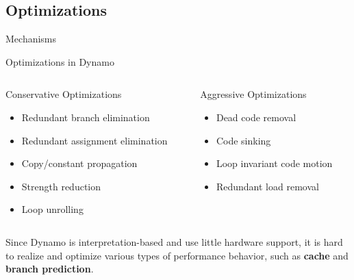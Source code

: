 \documentclass[aspectratio=169,xcolor=x11names]{beamer}
\begin{document}
	\subsection{Optimizations}
	\begin{frame}{Mechanisms}
	\end{frame}

	\begin{frame}{Optimizations in Dynamo}
		\begin{columns}
			\begin{column}[T]{0.5\linewidth}
				\begin{block}{Conservative Optimizations}
					\begin{itemize}
						\item Redundant branch elimination
						\item Redundant assignment elimination
						\item Copy/constant propagation
						\item Strength reduction
						\item Loop unrolling
					\end{itemize}
				\end{block}
			\end{column}
			\begin{column}[T]{0.5\linewidth}
				\begin{block}{Aggressive Optimizations}
					\begin{itemize}
						\item Dead code removal
						\item Code sinking
						\item Loop invariant code motion
						\item Redundant load removal %
					\end{itemize}
				\end{block}
			\end{column}
		\end{columns}
		
		Since Dynamo is interpretation-based and use little hardware support, it is hard to realize and optimize various types of performance behavior, such as \textbf{cache} and \textbf{branch prediction}.
	\end{frame}
\end{document}
